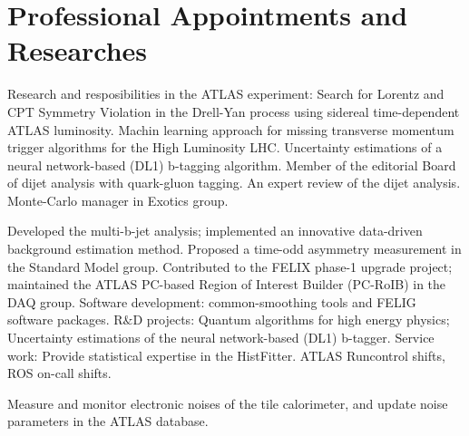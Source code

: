 \section{Professional Appointments and Researches}

\begin{cventries}
\end{cventries}

       Research and resposibilities in the ATLAS experiment: \newline
       Search for Lorentz and  CPT Symmetry Violation in the Drell-Yan process using 
       sidereal time-dependent ATLAS luminosity. Machin learning approach for missing 
       transverse momentum trigger algorithms for the High Luminosity LHC. 
        Uncertainty estimations of a neural network-based (DL1) b-tagging algorithm.\newline
        Member of the editorial Board of dijet analysis with quark-gluon tagging. 
        An expert review of the dijet analysis. \newline
        Monte-Carlo manager in Exotics group.  \newline
 
 \begin{cventries}   
  \end{cventries}
       Developed the multi-b-jet analysis; implemented an innovative data-driven background
       estimation method. Proposed a time-odd asymmetry measurement in the Standard Model group. \newline
        Contributed to the FELIX phase-1 upgrade project; maintained the ATLAS PC-based Region of 
        Interest Builder (PC-RoIB) in the DAQ group. \newline
        Software development: common-smoothing tools and FELIG software packages. \newline
        R$\&$D projects: Quantum algorithms for high energy physics; Uncertainty estimations 
        of the neural network-based (DL1) b-tagger. \newline
        Service work: Provide statistical expertise in the HistFitter. ATLAS Runcontrol shifts,
        ROS on-call shifts. \newline

    

\begin{cventries}
\end{cventries}
        Measure and monitor electronic noises of the tile calorimeter, and update noise parameters in the  ATLAS database.
 
